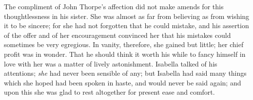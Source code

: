  The compliment of John Thorpe's affection did not make amends for this thoughtlessness in his sister. She was almost as far from believing as from wishing it to be sincere; for she had not forgotten that he could mistake, and his assertion of the offer and of her encouragement convinced her that his mistakes could sometimes be very egregious. In vanity, therefore, she gained but little; her chief profit was in wonder. That he should think it worth his while to fancy himself in love with her was a matter of lively astonishment. Isabella talked of his attentions; \textit{she} had never been sensible of any; but Isabella had said many things which she hoped had been spoken in haste, and would never be said again; and upon this she was glad to rest altogether for present ease and comfort. 